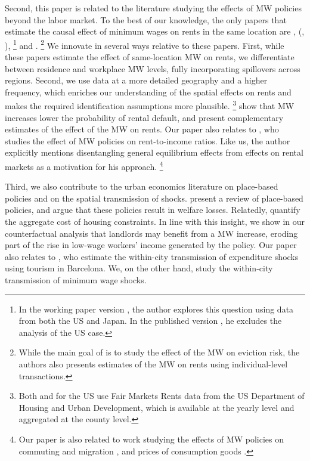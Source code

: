 Second, this paper is related to the literature studying the effects of MW 
policies beyond the labor market.
To the best of our knowledge, the only papers that estimate the causal effect 
of minimum wages on rents in the same location are \textcite{Tidemann2018}, 
\citeauthor{Yamagishi2019} (\cite*{Yamagishi2019}, \cite*{Yamagishi2021}),%
\footnote{In the working paper version \parencite{Yamagishi2019}, the author 
explores this question using data from both the US and Japan.
In the published version \parencite{Yamagishi2021}, he excludes the analysis of 
the US case.}
and \textcite{AgarwalEtAl2021}.%
\footnote{While the main goal of \textcite{AgarwalEtAl2021} is to study the 
effect of the MW on eviction risk, the authors also presents estimates of the
MW on rents using individual-level transactions.}
We innovate in several ways relative to these papers.
First, while these papers estimate the effect of same-location MW on rents, we 
differentiate between residence and workplace MW levels, fully incorporating
spillovers across regions.
Second, we use data at a more detailed geography and a higher frequency, which
enriches our understanding of the spatial effects on rents and makes the 
required identification assumptions more plausible.%
\footnote{Both \textcite{Tidemann2018} and \textcite{Yamagishi2019} for the US 
use Fair Markets Rents data from the US Department of Housing and Urban 
Development, which is available at the yearly level and aggregated at the 
county level.}
\textcite{AgarwalEtAl2021} show that MW increases lower the probability of 
rental default, and present complementary estimates of the effect of the MW 
on rents.
Our paper also relates to \textcite{Hughes2020}, who studies the effect of 
MW policies on rent-to-income ratios.
Like us, the author explicitly mentions disentangling general equilibrium 
effects from effects on rental markets as a motivation for his approach.%
\footnote{Our paper is also related to work studying the effects of MW policies 
on commuting and migration \parencite{Cadena2014, Monras2019, PerezPerez2021}, and 
prices of consumption goods \parencite{AllegrettoReich2018, Leung2021}.}

Third, we also contribute to the urban economics literature on place-based 
policies and on the spatial transmission of shocks.
\textcite{KlineMoretti2014} present a review of place-based policies, and 
argue that these policies result in welfare losses.
Relatedly, \textcite{HsiehMoretti2019} quantify the aggregate cost of housing 
constraints.
In line with this insight, we show in our counterfactual analysis that landlords
may benefit from a MW increase, eroding part of the rise in low-wage workers' 
income generated by the policy.
Our paper also relates to \textcite{AllenEtAl2020}, who estimate the 
within-city transmission of expenditure shocks using tourism in Barcelona.
We, on the other hand, study the within-city transmission of minimum wage shocks.

